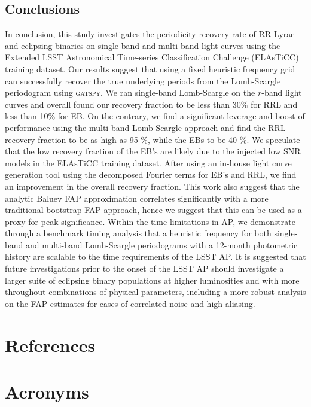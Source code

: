 \documentclass[DM,authoryear,toc]{lsstdoc}
\begin{document}
\subsection{Conclusions}
In conclusion, this study investigates the periodicity recovery rate of RR Lyrae and eclipsing binaries on single-band and multi-band light curves using the Extended LSST Astronomical Time-series Classification Challenge (ELAsTiCC) training dataset. Our results suggest that using a fixed heuristic frequency grid can successfully recover the true underlying periods from the Lomb-Scargle periodogram using \textsc{gatspy}. We ran single-band Lomb-Scargle on the $r$-band light curves and overall found our recovery fraction to be less than 30$\%$ for RRL and less than 10$\%$ for EB. On the contrary,  we find a significant leverage and boost of performance using the multi-band Lomb-Scargle approach and find the RRL recovery fraction to be as high as 95 $\%$, while the EBs to be 40 $\%$. We speculate that the low recovery fraction of the EB's are likely due to the injected low SNR models in the ELAsTiCC training dataset. After using an in-house light curve generation tool using the decomposed Fourier terms for EB's and RRL, we find an improvement in the overall recovery fraction. This work also suggest that the analytic Baluev FAP approximation correlates significantly with a more traditional bootstrap FAP approach, hence we suggest that this can be used as a proxy for peak significance. Within the time limitations in AP, we demonstrate through a benchmark timing analysis that a heuristic frequency for both single-band and multi-band Lomb-Scargle periodograms with a 12-month photometric history are scalable to the time requirements of the LSST AP. It is suggested that future investigations prior to the onset of the LSST AP should investigate a larger suite of eclipsing binary populations at higher luminosities and with more throughout combinations of physical parameters, including a more robust analysis on the FAP estimates for cases of correlated noise and high aliasing. 

\appendix
\section{References} \label{sec:bib}


\section{Acronyms} \label{sec:acronyms}

\end{document}
